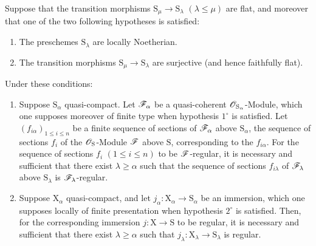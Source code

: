 \begin{proposition}[19.8.1]
\label{IV.19.8.1}
Suppose that the transition morphisms $\mathrm{S}_\mu\to\mathrm{S}_\lambda$ $(\lambda\leqslant\mu)$ are flat, and moreover that \textup{one} of the two following hypotheses is satisfied:
\begin{enumerate}
\item[$1^\circ$] The preschemes $\mathrm{S}_\lambda$ are locally Noetherian.
\item[$2^\circ$] The transition morphisms $\mathrm{S}_\mu\to\mathrm{S}_\lambda$ are surjective (and hence faithfully flat).
\end{enumerate}

Under these conditions:
\begin{enumerate}
\item[\rm(i)] Suppose $\mathrm{S}_\alpha$ quasi-compact. Let $\mathscr{F}_\alpha$ be a quasi-coherent $\mathscr{O}_{\mathrm{S}_\alpha}$-Module, which one supposes moreover of finite type when hypothesis $1^\circ$ is satisfied. Let $(f_{i\alpha})_{1\leqslant i\leqslant n}$ be a finite sequence of sections of $\mathscr{F}_\alpha$ above $\mathrm{S}_\alpha$, the sequence of sections $f_i$ of the $\mathscr{O}_\mathrm{S}$-Module $\mathscr{F}$ above $\mathrm{S}$, corresponding to the $f_{i\alpha}$. For the sequence of sections $f_i$ $(1\leqslant i\leqslant n)$ to be $\mathscr{F}$-regular, it is necessary and sufficient that there exist $\lambda\geqslant\alpha$ such that the sequence of sections $f_{i\lambda}$ of $\mathscr{F}_\lambda$ above $\mathrm{S}_\lambda$ is $\mathscr{F}_\lambda$-regular.
\item[\rm(ii)] Suppose $\mathrm{X}_\alpha$ quasi-compact, and let $j_\alpha:\mathrm{X}_\alpha\to\mathrm{S}_\alpha$ be an immersion, which one supposes locally of finite presentation when hypothesis $2^\circ$ is satisfied. Then, for the corresponding immersion $j:\mathrm{X}\to\mathrm{S}$ to be regular, it is necessary and sufficient that there exist $\lambda\geqslant\alpha$ such that $j_\lambda:\mathrm{X}_\lambda\to\mathrm{S}_\lambda$ is regular.
\end{enumerate}
\end{proposition}

